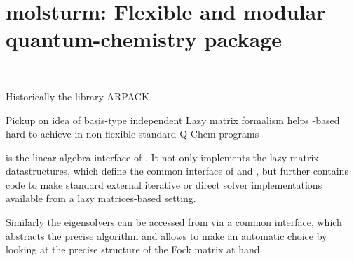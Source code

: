 \chapter{molsturm: Flexible and modular quantum-chemistry package}
\label{ch:Molsturm}
 \\

Historically the \fortran library ARPACK~\cite{Lehoucq1998}

Pickup on idea of basis-type independent \SCF
Lazy matrix formalism helps
\contraction-based \SCF hard to achieve in non-flexible standard
Q-Chem programs

\lazyten is the linear algebra interface of \molsturm.
It not only implements the lazy matrix datastructures,
which define the common interface of \gint and \gscf,
but further contains code to make standard external
iterative or direct solver implementations available
from a lazy matrices-based setting.

Similarly the eigensolvers can be accessed from \gscf via a common interface,
which abstracts the precise algorithm and allows \lazyten to make an automatic
choice by looking at the precise structure of the Fock matrix at hand.







